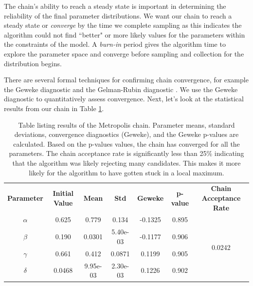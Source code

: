  \par The chain's ability to reach a steady state is important in determining the reliability of the final parameter distributions. We want our chain to reach a steady state or \emph{converge} by the time we complete sampling as this indicates the algorithm could not find ``better" or more likely values for the parameters within the constraints of the model. A \textit{burn-in} period gives the algorithm time to explore the parameter space and converge before sampling and collection for the distribution begins.
\par There are several formal techniques for confirming chain convergence, for example the Geweke diagnostic \cite{geweke1} and the Gelman-Rubin diagnostic \cite{gelman_rubin}. We use the Geweke diagnostic to quantitatively assess convergence. Next, let's look at the statistical results from our chain in Table \ref{tab:1mcmc}.
\begin{table}[H]
\centering
        \begin{tabular}{c c|c c |c c ||c}
            \hline
            \textbf{Parameter} & \textbf{Initial Value} & \textbf{Mean} & \textbf{Std} &  \textbf{Geweke} & \textbf{p-value} & \textbf{Chain Acceptance Rate}\\ 
            \cline{1-7}
            $\alpha$ & 0.625 & 0.779 & 0.134 & -0.1325 & 0.895 & \multirow{4}{*}{0.0242} \\
            $\beta$ & 0.190 & 0.0301 & 5.40e-03 & -0.1177 & 0.906\\
            $\gamma$ & 0.661 & 0.412 & 0.0871 & 0.1199 & 0.905\\
            $\delta$ & 0.0468 & 9.95e-03 & 2.30e-03 & 0.1226 & 0.902 
            \\\hline
                          \hline
        \end{tabular}
    \caption{Table listing results of the Metropolis chain. Parameter means, standard deviations, convergence diagnostics (Geweke), and the Geweke p-values are calculated. Based on the p-values values, the chain has converged for all the parameters. The chain acceptance rate is significantly less than 25\% indicating that the algorithm was likely rejecting many candidates. This makes it more likely for the algorithm to have gotten stuck in a local maximum.}
    \label{tab:1mcmc}
\end{table}
